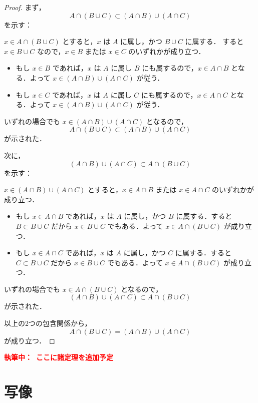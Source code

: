 \documentclass[a4paper,11pt]{ltjsarticle}
\newenvironment{tleftbar}{\begin{tbleftline}\setlength{\parindent}{1\zw}}{\end{tbleftline}}
\newcommand{\draftnote}[1]{\begin{center}\textbf{\textcolor{red}{執筆中：~#1}}\end{center}}
\begin{document}
\begin{tleftbar}
  \begin{proof}
    まず，
    \[
      A \cap (B \cup C) \subset (A \cap B) \cup (A \cap C)
    \]
    を示す：

    $x \in A \cap (B \cup C)$ とすると，$x$ は $A$ に属し，かつ $B \cup C$ に属する．
    すると $x \in B \cup C$ なので，$x \in B$ または $x \in C$ のいずれかが成り立つ．
    \begin{itemize}
      \item もし $x \in B$ であれば，$x$ は $A$ に属し $B$ にも属するので，$x \in A \cap B$ となる．よって $x \in (A \cap B) \cup (A \cap C)$ が従う．
      \item もし $x \in C$ であれば，$x$ は $A$ に属し $C$ にも属するので，$x \in A \cap C$ となる．よって $x \in (A \cap B) \cup (A \cap C)$ が従う．
    \end{itemize}
    いずれの場合でも $x \in (A \cap B) \cup (A \cap C)$ となるので，
    \[
      A \cap (B \cup C) \subset (A \cap B) \cup (A \cap C)
    \]
    が示された．

    次に，
    \[
      (A \cap B) \cup (A \cap C) \subset A \cap (B \cup C)
    \]
    を示す：

    $x \in (A \cap B) \cup (A \cap C)$ とすると，$x \in A \cap B$ または $x \in A \cap C$ のいずれかが成り立つ．
    \begin{itemize}
      \item もし $x \in A \cap B$ であれば，$x$ は $A$ に属し，かつ $B$ に属する．すると $B \subset B \cup C$ だから $x \in B \cup C$ でもある．よって $x \in A \cap (B \cup C)$ が成り立つ．
      \item もし $x \in A \cap C$ であれば，$x$ は $A$ に属し，かつ $C$ に属する．すると $C \subset B \cup C$ だから $x \in B \cup C$ でもある．よって $x \in A \cap (B \cup C)$ が成り立つ．
    \end{itemize}
    いずれの場合でも $x \in A \cap (B \cup C)$ となるので，
    \[
      (A \cap B) \cup (A \cap C) \subset A \cap (B \cup C)
    \]
    が示された．

    以上の2つの包含関係から，
    \[
      A \cap (B \cup C) =(A \cap B) \cup (A \cap C)
    \]
    が成り立つ．
  \end{proof}
\end{tleftbar}

\draftnote{ここに諸定理を追加予定}

\newpage
{}
\section{写像}
\end{document}
